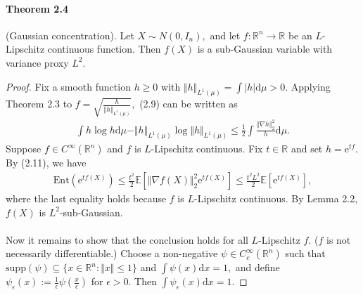 \documentclass{article}
\newcommand{\E}{\mathbb{E}}
\begin{document}
\paragraph{Theorem 2.4} (Gaussian concentration). Let $X\sim N(0,I_n),$ and let $f:\mathbb{R}^n\to\mathbb{R}$ be an $L$-Lipschitz continuous function. Then $f(X)$ is a sub-Gaussian variable with variance proxy $L^2.$
\begin{proof}
Fix a smooth function $h\geq 0$ with $\Vert h\Vert_{L^1(\mu)} = \int\vert h\vert\mathrm{d}\mu > 0.$ Applying Theorem 2.3 to $f=\sqrt{\frac{h}{\Vert h\Vert_{L^1(\mu)}}},$ (2.9) can be written as
\begin{align*}
	\int h\log h\mathrm{d}\mu - \Vert h\Vert_{L^1(\mu)}\log\Vert h\Vert_{L^1(\mu)} \leq \frac{1}{2}\int\frac{\left\Vert\nabla h\right\Vert_2^2}{h}\mathrm{d}\mu.\tag{2.11}
\end{align*}
Suppose $f\in C^\infty(\mathbb{R}^n)$ and $f$ is $L$-Lipschitz continuous. Fix $t\in\mathbb{R}$ and set $h=\mathrm{e}^{tf}$. By (2.11), we have
\begin{align*}
	\mathrm{Ent}\left(\mathrm{e}^{tf(X)}\right)\leq \frac{t^2}{2}\E\left[\Vert\nabla f(X)\Vert_2^2\mathrm{e}^{tf(X)}\right]\leq \frac{t^2L^2}{2}\E\left[\mathrm{e}^{tf(X)}\right],\tag{2.12}
\end{align*}
where the last equality holds because $f$ is $L$-Lipschitz continuous. By Lemma 2.2, $f(X)$ is $L^2$-sub-Gaussian.

\paragraph{} Now it remains to show that the conclusion holds for all $L$-Lipschitz $f.$ ($f$ is not necessarily differentiable.) Choose a non-negative $\psi\in C_c^\infty(\mathbb{R}^n)$ such that $\mathrm{supp}(\psi)\subseteq\{x\in\mathbb{R}^n:\Vert x\Vert \leq 1\}$ and $\int\psi(x)\mathrm{d}x=1,$ and define $\psi_\epsilon(x):=\frac{1}{\epsilon}\psi\left(\frac{x}{\epsilon}\right)$ for $\epsilon>0.$ Then $\int\psi_\epsilon(x)\mathrm{d}x=1.$


\end{proof}
\end{document}
